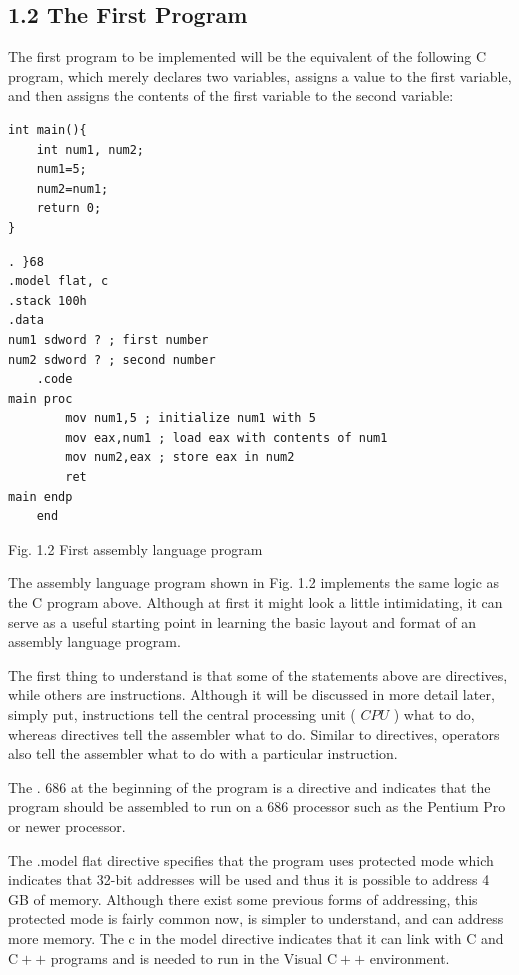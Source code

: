 \documentclass[10pt]{article}
\begin{document}
\subsection*{1.2 The First Program}
The first program to be implemented will be the equivalent of the following C program, which merely declares two variables, assigns a value to the first variable, and then assigns the contents of the first variable to the second variable:

\begin{verbatim}
int main(){
    int num1, num2;
    num1=5;
    num2=num1;
    return 0;
}
\end{verbatim}

\begin{verbatim}
. }68
.model flat, c
.stack 100h
.data
num1 sdword ? ; first number
num2 sdword ? ; second number
    .code
main proc
        mov num1,5 ; initialize num1 with 5
        mov eax,num1 ; load eax with contents of num1
        mov num2,eax ; store eax in num2
        ret
main endp
    end
\end{verbatim}

Fig. 1.2 First assembly language program

The assembly language program shown in Fig. 1.2 implements the same logic as the C program above. Although at first it might look a little intimidating, it can serve as a useful starting point in learning the basic layout and format of an assembly language program.

The first thing to understand is that some of the statements above are directives, while others are instructions. Although it will be discussed in more detail later, simply put, instructions tell the central processing unit ( $C P U$ ) what to do, whereas directives tell the assembler what to do. Similar to directives, operators also tell the assembler what to do with a particular instruction.

The . 686 at the beginning of the program is a directive and indicates that the program should be assembled to run on a 686 processor such as the Pentium Pro or newer processor.

The .model flat directive specifies that the program uses protected mode which indicates that 32-bit addresses will be used and thus it is possible to address 4 GB of memory. Although there exist some previous forms of addressing, this protected mode is fairly common now, is simpler to understand, and can address more memory. The c in the model directive indicates that it can link with C and $\mathrm{C}++$ programs and is needed to run in the Visual $\mathrm{C}++$ environment.
\end{document}
